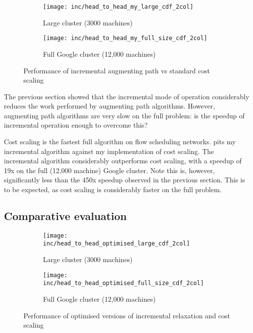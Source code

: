 \begin{figure}
    \begin{widepage}
        \begin{subfigure}[c]{0.5\textwidth}
            \texttt{[image: inc/head\_to\_head\_my\_large\_cdf\_2col]}
            \caption{Large cluster (3000 machines)}
        \end{subfigure}
        \begin{subfigure}[c]{0.5\textwidth}
            \texttt{[image: inc/head\_to\_head\_my\_full\_size\_cdf\_2col]}
            \caption{Full Google cluster (12,000 machines)}
        \end{subfigure}
    \end{widepage}
    \caption{Performance of incremental augmenting path vs standard cost scaling}
    \label{fig:inc-head-to-head-my}
\end{figure}

The previous section showed that the incremental mode of operation considerably reduces the work performed by augmenting path algorithms. However, augmenting path algorithms are very slow on the full problem\footnotemark: is the speedup of incremental operation enough to overcome this?

Cost scaling is the fastest full algorithm on flow scheduling networks.   pits my incremental algorithm against my implementation of cost scaling. The incremental algorithm considerably outperforms cost scaling, with a speedup of 19x on the full (12,000 machine) Google cluster. Note this is, however, significantly less than the 450x speedup observed in the previous section. This is to be expected, as cost scaling is considerably faster on the full problem.

\subsection{Comparative evaluation}

\begin{figure}
    \begin{widepage}
        \begin{subfigure}[c]{0.5\textwidth}
            \texttt{[image: inc/head\_to\_head\_optimised\_large\_cdf\_2col]}
            \caption{Large cluster (3000 machines)}
            \label{fig:inc-head-to-head-optimised:large}
        \end{subfigure}
        \begin{subfigure}[c]{0.5\textwidth}
            \texttt{[image: inc/head\_to\_head\_optimised\_full\_size\_cdf\_2col]}
            \caption{Full Google cluster (12,000 machines)}
            \label{fig:inc-head-to-head-optimised:full-size}
        \end{subfigure}
    \end{widepage}
    \caption{Performance of optimised versions of incremental relaxation and cost scaling}
    \label{fig:inc-head-to-head-optimised}
\end{figure}

